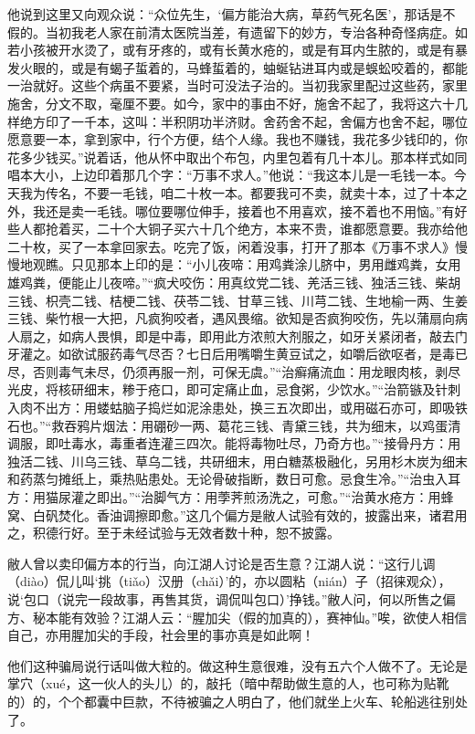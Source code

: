 \documentclass[12pt,UTF8]{ctexbook}
\begin{document}
他说到这里又向观众说：“众位先生，‘偏方能治大病，草药气死名医’，那话是不假的。当初我老人家在前清太医院当差，有遗留下的妙方，专治各种奇怪病症。如若小孩被开水烫了，或有牙疼的，或有长黄水疮的，或是有耳内生脓的，或是有暴发火眼的，或是有蝎子蜇着的，马蜂蜇着的，蚰蜒钻进耳内或是蜈蚣咬着的，都能一治就好。这些个病虽不要紧，当时可没法子治的。当初我家里配过这些药，家里施舍，分文不取，毫厘不要。如今，家中的事由不好，施舍不起了，我将这六十几样绝方印了一千本，这叫：半积阴功半济财。舍药舍不起，舍偏方也舍不起，哪位愿意要一本，拿到家中，行个方便，结个人缘。我也不赚钱，我花多少钱印的，你花多少钱买。”说着话，他从怀中取出个布包，内里包着有几十本儿。那本样式如同唱本大小，上边印着那几个字：“万事不求人。”他说：“我这本儿是一毛钱一本。今天我为传名，不要一毛钱，咱二十枚一本。都要我可不卖，就卖十本，过了十本之外，我还是卖一毛钱。哪位要哪位伸手，接着也不用喜欢，接不着也不用恼。”有好些人都抢着买，二十个大铜子买六十几个绝方，本来不贵，谁都愿意要。我亦给他二十枚，买了一本拿回家去。吃完了饭，闲着没事，打开了那本《万事不求人》慢慢地观瞧。只见那本上印的是：“小儿夜啼：用鸡粪涂儿脐中，男用雌鸡粪，女用雄鸡粪，便能止儿夜啼。”“疯犬咬伤：用真纹党二钱、羌活三钱、独活三钱、柴胡三钱、枳壳二钱、桔梗二钱、茯苓二钱、甘草三钱、川芎二钱、生地榆一两、生姜三钱、柴竹根一大把，凡疯狗咬者，遇风畏缩。欲知是否疯狗咬伤，先以蒲扇向病人扇之，如病人畏惧，即是中毒，即用此方浓煎大剂服之，如牙关紧闭者，敲去门牙灌之。如欲试服药毒气尽否？七日后用嘴嚼生黄豆试之，如嚼后欲呕者，是毒已尽，否则毒气未尽，仍须再服一剂，可保无虞。”“治癣痛流血：用龙眼肉核，剥尽光皮，将核研细末，糁于疮口，即可定痛止血，忌食粥，少饮水。”“治箭镞及针刺入肉不出方：用蝼蛄脑子捣烂如泥涂患处，换三五次即出，或用磁石亦可，即吸铁石也。”“救吞鸦片烟法：用硼砂一两、葛花三钱、青黛三钱，共为细末，以鸡蛋清调服，即吐毒水，毒重者连灌三四次。能将毒物吐尽，乃奇方也。”“接骨丹方：用独活二钱、川乌三钱、草乌二钱，共研细末，用白糖蒸极融化，另用杉木炭为细末和药蒸匀摊纸上，乘热贴患处。无论骨破指断，数日可愈。忌食生冷。”“治虫入耳方：用猫尿灌之即出。”“治脚气方：用荸荠煎汤洗之，可愈。”“治黄水疮方：用蜂窝、白矾焚化。香油调擦即愈。”这几个偏方是敝人试验有效的，披露出来，诸君用之，积德行好。至于未经试验与无效者数十种，恕不披露。

敝人曾以卖印偏方本的行当，向江湖人讨论是否生意？江湖人说：“这行儿调（diào）侃儿叫‘挑（tiǎo）汉册（chǎi）’的，亦以圆粘（nián）子（招徕观众），说‘包口（说完一段故事，再售其货，调侃叫包口）’挣钱。”敝人问，何以所售之偏方、秘本能有效验？江湖人云：“腥加尖（假的加真的），赛神仙。”唉，欲使人相信自己，亦用腥加尖的手段，社会里的事亦真是如此啊！

他们这种骗局说行话叫做大粒的。做这种生意很难，没有五六个人做不了。无论是掌穴（xué，这一伙人的头儿）的，敲托（暗中帮助做生意的人，也可称为贴靴的）的，个个都囊中巨款，不待被骗之人明白了，他们就坐上火车、轮船逃往别处了。
\end{document}
